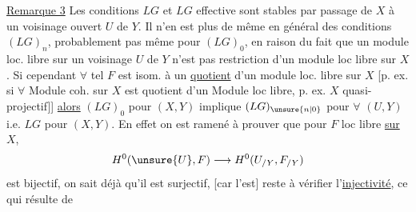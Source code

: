 
\uline{Remarque 3} Les conditions $LG$ et $LG$ effective sont
stables par passage de $X$ à un voisinage ouvert $U$ de $Y$.
Il n'en est plus de même en général des conditions $(LG)_n$,
probablement pas même pour $(LG)_0$, en raison du fait
que un module loc. libre  sur un voisinage $U$
de $Y$ n'est pas restriction d'un module loc libre sur
 $X$.
Si cependant $\forall$ tel $F$ est isom. à un \uline{quotient}
d'un module loc. libre sur $X$ [p. ex. si $\forall$ Module
coh. sur $X$ est quotient d'un Module loc libre,
p. ex. $X$ quasi-projectif]]
\uline{alors} $(LG)_0$ pour $(X,Y)$ implique
$(LG)_{\unsure{n|0}}$ pour $\forall$ $(U,Y)$ i.e. $LG$ pour $(X,Y)$.
En effet on est ramené à prouver que pour $F$ loc libre
\uline{sur $X$},
\[
H^0(\unsure{U},F)\longrightarrow H^0(U_{/Y},F_{/Y})
\]
est bijectif, on sait déjà qu'il est surjectif,
[car
l'est] reste à vérifier l'\uline{injectivité}, ce qui résulte de
 

